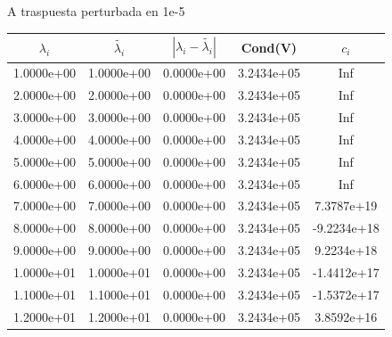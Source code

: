 \documentclass{article}
\begin{document}
\begin{itemize}
\begin{enumerate}[(a)]
\begin{figure}[h!]
\begin{tabular}{c|c|c|c|c}
\end{tabular}
\caption{A traspuesta perturbada en 1e-5}
\end{figure}
\begin{figure}[h!]
\centering
\begin{tabular}{c|c|c|c|c}
$\lambda_{i}$&$\tilde{\lambda_{i}}$ &$|\lambda_{i}-\tilde{\lambda_{i}}|$ &Cond(V) &$c_i$\\
\hline
1.0000e+00&1.0000e+00&0.0000e+00&3.2434e+05&Inf\\
\hline
2.0000e+00&2.0000e+00&0.0000e+00&3.2434e+05&Inf\\
\hline
3.0000e+00&3.0000e+00&0.0000e+00&3.2434e+05&Inf\\
\hline
4.0000e+00&4.0000e+00&0.0000e+00&3.2434e+05&Inf\\
\hline
5.0000e+00&5.0000e+00&0.0000e+00&3.2434e+05&Inf\\
\hline
6.0000e+00&6.0000e+00&0.0000e+00&3.2434e+05&Inf\\
\hline
7.0000e+00&7.0000e+00&0.0000e+00&3.2434e+05&7.3787e+19\\
\hline
8.0000e+00&8.0000e+00&0.0000e+00&3.2434e+05&-9.2234e+18\\
\hline
9.0000e+00&9.0000e+00&0.0000e+00&3.2434e+05&9.2234e+18\\
\hline
1.0000e+01&1.0000e+01&0.0000e+00&3.2434e+05&-1.4412e+17\\
\hline
1.1000e+01&1.1000e+01&0.0000e+00&3.2434e+05&-1.5372e+17\\
\hline
1.2000e+01&1.2000e+01&0.0000e+00&3.2434e+05&3.8592e+16\\
\hline


\end{tabular}
\end{figure}
\end{enumerate}
\end{itemize}
\end{document}
